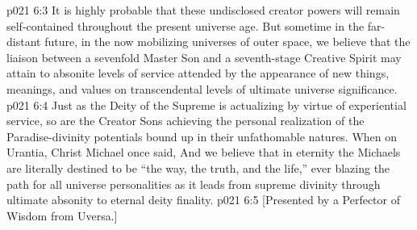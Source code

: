 \vs p021 6:3 It is highly probable that these undisclosed creator powers will remain self\hyp{}contained throughout the present universe age. But sometime in the far\hyp{}distant future, in the now mobilizing universes of outer space, we believe that the liaison between a sevenfold Master Son and a seventh\hyp{}stage Creative Spirit may attain to absonite levels of service attended by the appearance of new things, meanings, and values on transcendental levels of ultimate universe significance.
\vs p021 6:4 Just as the Deity of the Supreme is actualizing by virtue of experiential service, so are the Creator Sons achieving the personal realization of the Paradise\hyp{}divinity potentials bound up in their unfathomable natures. When on Urantia, Christ Michael once said,  And we believe that in eternity the Michaels are literally destined to be “the way, the truth, and the life,” ever blazing the path for all universe personalities as it leads from supreme divinity through ultimate absonity to eternal deity finality.
\vsetoff
\vs p021 6:5 [Presented by a Perfector of Wisdom from Uversa.]
